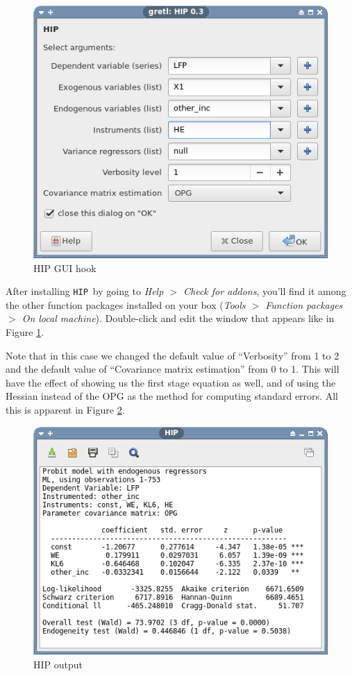 \documentclass[a4paper,10pt]{article}
\newcommand{\HIP}{\texttt{HIP}}
\begin{document}
\begin{figure}[htbp]
  \centering
  \includegraphics[scale=0.5]{HIP-sshot1.png}
  \caption{HIP GUI hook}
  \label{fig:HIP_window}
\end{figure}

After installing \HIP\, by going to \emph{Help $>$ Check for addons},
you'll find it among the other function packages installed on your box
(\emph{Tools $>$ Function packages $>$ On local
  machine}). Double-click and edit the window that appears like in
Figure \ref{fig:HIP_window}.

Note that in this case we changed the default value of ``Verbosity''
from 1 to 2 and the default value of ``Covariance matrix estimation''
from 0 to 1. 
%
%
This will have the effect of showing us the first stage
equation as well, and of using the Hessian instead of the OPG as the
method for computing standard errors. All this is apparent in Figure
\ref{fig:HIP_output}.

\begin{figure}[htbp]
  \centering
  \includegraphics[scale=0.5]{HIP-sshot2.png}
  \caption{HIP output}
  \label{fig:HIP_output}
\end{figure}
\end{document}
